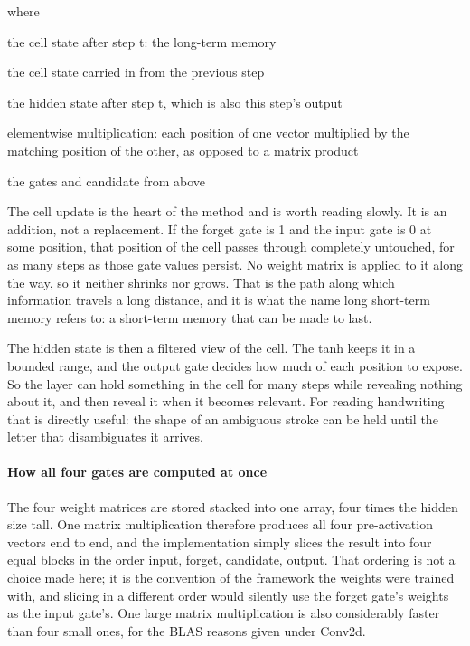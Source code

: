 \noindent where
\begin{description}[leftmargin=2.4em,style=nextline,font=\normalfont\ttfamily]\setlength\itemsep{1pt}
  \item[{$c_t$}] \normalfont the cell state after step t: the long-term memory
  \item[{$c_{t-1}$}] \normalfont the cell state carried in from the previous step
  \item[{$h_t$}] \normalfont the hidden state after step t, which is also this step's output
  \item[{$\odot$}] \normalfont elementwise multiplication: each position of one vector multiplied by the matching position of the other, as opposed to a matrix product
  \item[{$f_t,\, i_t,\, g_t,\, o_t$}] \normalfont the gates and candidate from above
\end{description}
The cell update is the heart of the method and is worth reading slowly. It is an addition, not a replacement. If the forget gate is 1 and the input gate is 0 at some position, that position of the cell passes through completely untouched, for as many steps as those gate values persist. No weight matrix is applied to it along the way, so it neither shrinks nor grows. That is the path along which information travels a long distance, and it is what the name long short-term memory refers to: a short-term memory that can be made to last.

The hidden state is then a filtered view of the cell. The tanh keeps it in a bounded range, and the output gate decides how much of each position to expose. So the layer can hold something in the cell for many steps while revealing nothing about it, and then reveal it when it becomes relevant. For reading handwriting that is directly useful: the shape of an ambiguous stroke can be held until the letter that disambiguates it arrives.


\paragraph{How all four gates are computed at once}
The four weight matrices are stored stacked into one array, four times the hidden size tall. One matrix multiplication therefore produces all four pre-activation vectors end to end, and the implementation simply slices the result into four equal blocks in the order input, forget, candidate, output. That ordering is not a choice made here; it is the convention of the framework the weights were trained with, and slicing in a different order would silently use the forget gate's weights as the input gate's. One large matrix multiplication is also considerably faster than four small ones, for the BLAS reasons given under Conv2d.



